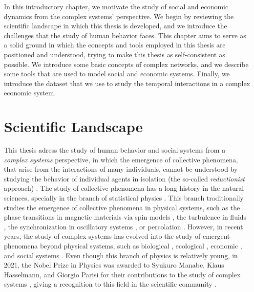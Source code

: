 \setcounter{page}{1}

In this introductory chapter, we motivate the study of social and economic dynamics from the complex systems' perspective. We begin by reviewing the scientific landscape in which this thesis is developed, and we introduce the challenges that the study of human behavior faces. This chapter aims to serve as a solid ground in which the concepts and tools employed in this thesis are positioned and understood, trying to make this thesis as self-consistent as possible. We introduce some basic concepts of complex networks, and we describe some tools that are used to model social and economic systems. Finally, we introduce the dataset that we use to study the temporal interactions in a complex economic system.

\section{\label{sec:scie_lands} Scientific Landscape}

This thesis adress the study of human behavior and social systems from a \textit{complex systems} perspective, in which the emergence of collective phenomena, that arise from the interactions of many individuals, cannot be understood by studying the behavior of individual agents in isolation (the so-called \textit{reductionist} approach) \cite{anderson1972more}. The study of collective phenomena has a long history in the natural sciences, specially in the branch of statistical physics \cite{stanley1971phase}. This branch traditionally studies the emergence of collective phenomena in physical systems, such as the phase transitions in magnetic materials via spin models \cite{onsager-1944}, the turbulence in fluids \cite{frisch1995turbulence}, the synchronization in oscillatory systems \cite{pikovsky2001universal}, or percolation \cite{stauffer-1985}. However, in recent years, the study of complex systems has evolved into the study of emergent phenomena beyond physical systems, such as biological \cite{brown2000scaling,aderem-2005,alon2019introduction}, ecological \cite{may-2001}, economic \cite{limburg2002complex}, and social systems \cite{castellano2009statistical}. Even though this branch of physics is relatively young, in 2021, the Nobel Prize in Physics was awarded to Syukuro Manabe, Klaus Hasselmann, and Giorgio Parisi for their contributions to the study of complex systems \cite{nobel-2021}, giving a recognition to this field in the scientific community \cite{bianconi2023complex}.

